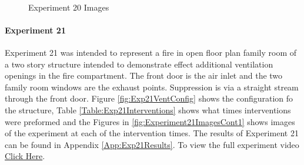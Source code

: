 \documentclass{article}
\begin{document}
\clearpage

\begin{figure}[H]
	\ContinuedFloat 
	\centering 
	 \ 
	\caption{Experiment 20 Images}
	\label{fig:Experiment20ImagesCont3} 
\end{figure}

\paragraph{Experiment 21}\mbox{}

Experiment 21 was intended to represent a fire in open floor plan family room of a two story structure intended to demonstrate effect additional ventilation openings in the fire compartment. The front door is the air inlet and the two family room windows are the exhaust points. Suppression is via a straight stream through the front door. Figure \ref{fig:Exp21VentConfig} shows the configuration fo the structure, Table \ref{Table:Exp21Interventions} shows what times interventions were preformed and the Figures in \ref{fig:Experiment21ImagesCont1} shows images of the experiment at each of the intervention times. The results of Experiment 21 can be found in Appendix \ref{App:Exp21Results}. To view the full experiment video \href{https://youtu.be/ykWOmLX9Xts}{Click Here}.
\end{document}
